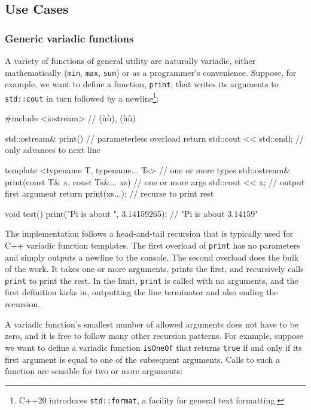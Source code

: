\subsection[Use Cases]{Use Cases}\label{use-cases-variadic}

\subsubsection[Generic variadic functions]{Generic variadic functions}\label{generic-variadic-functions}

A variety of functions of general utility are naturally variadic, either
mathematically (\lstinline!min!, \lstinline!max!, \lstinline!sum!) or as a
programmer's convenience. Suppose, for example, we want to define a
function, \lstinline!print!, that writes its arguments to
\lstinline!std::cout! in turn followed by a newline{\cprotect\footnote{C++20
introduces \lstinline!std::format!, a facility for general text
  formatting.}}:

\begin{emcppslisting}
#include <iostream>  // (ù{}ù), (ù{}ù)

std::ostream& print()                // parameterless overload
{
    return std::cout << std::endl;   // only advances to next line
}

template <typename T, typename... Ts>             // one or more types
std::ostream& print(const T& x, const Ts&... xs)  // one or more args
{
    std::cout << x;                               // output first argument
    return print(xs...);                          // recurse to print rest
}

void test()
{
    print("Pi is about ", 3.14159265);            // "Pi is about 3.14159"
}
\end{emcppslisting}
    

\noindent The implementation follows a head-and-tail recursion that is typically
used for C++ variadic function templates. The first overload of
\lstinline!print! has no parameters and simply outputs a newline to the
console. The second overload does the bulk of the work. It takes one or
more arguments, prints the first, and recursively calls \lstinline!print!
to print the rest. In the limit, \lstinline!print! is called with no
arguments, and the first definition kicks in, outputting the line
terminator and also ending the recursion.

A variadic function's smallest number of allowed arguments does not have
to be zero, and it is free to follow many other recursion patterns. For
example, suppose we want to define a variadic function \lstinline!isOneOf!
that returns \lstinline!true! if and only if its first argument is equal to
one of the subsequent arguments. Calls to such a function are sensible
for two or more arguments:

